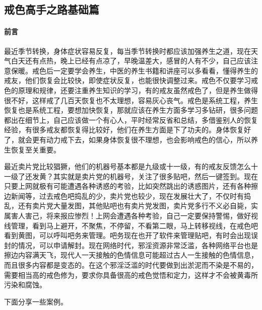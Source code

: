 \subsection{戒色高手之路基础篇}\label{120}

\paragraph*{前言}

最近季节转换，身体症状容易反复，每当季节转换时都应该加强养生之道，现在天气白天还有点热，晚上已经有点凉了，早晚温差大，感冒的人有不少，自己应该注意保暖。戒色后一定要学会养生，中医的养生书籍和讲座可以多看看，懂得养生的戒友，他们恢复会比较快，即使症状反复，也能很快调整过来。戒色不仅要学习戒色的原理和规律，还要注重养生知识的学习，有的戒友虽然戒色了，但是养生做得很不好，这样戒了几百天恢复也不太理想，容易灰心丧气。戒色是系统工程，养生恢复也是系统工程，要想加快恢复，那就应该在养生方面多学习多钻研，很多问题都出在细节上，自己应该做一个有心人，平时经常反省和总结，多借鉴别人的恢复经验，有很多戒友都恢复得比较好，他们在养生方面是下了功夫的。身体恢复好了，就会更有动力戒下去，如果身体恢复很不理想，也会影响戒色的信心，所以养生恢复至关重要。

最近卖片党比较猖獗，他们的机器号基本都是九级或十一级，有的戒友反馈怎么十一级了还发黄？其实就是卖片党的机器号，关注了很多贴吧，然后一键签到。现在只要上网就极有可能遭遇各种诱惑的考验，比如突然跳出的诱惑图片，还有各种擦边新闻等，过去戒色吧捣乱的少，卖片党也较少，现在发展壮大了，不仅时有捣乱，还有卖片党大量发图，其他贴吧也有卖片党发图，卖片党多行不义必自毙，实属害人害己，将来报应惨烈！上网会遭遇各种考验，自己一定要保持警惕，做好视线管理，看到马上避开，不聚焦，不停留，不看第二眼，马上转移视线，在戒色吧看到黄图，可以呼叫吧务来管理。吧务现在也开了软件来管理贴吧，有时会出现误封的情况，可以申请解封。现在网络时代，邪淫资源非常泛滥，各种网络平台也是擦边内容满天飞，现代人一天接触的色情信息可能超过古人一生接触的色情信息，而且很多内容都是变态的。在这个邪淫泛滥的时代要做到出淤泥而不染是不易的，需要相当高的戒色修为，要求你具备很高的戒色觉悟和定力，这样才不会被黄毒所污染和腐蚀。

下面分享一些案例。

